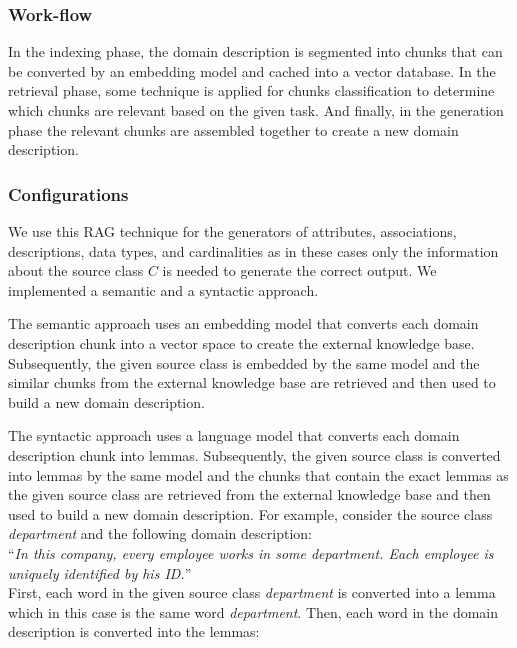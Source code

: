 \subsubsection{Work-flow}

In the indexing phase, the domain description is segmented into chunks that can be converted by an embedding model and cached into a vector database. In the retrieval phase, some technique is applied for chunks classification to determine which chunks are relevant based on the given task. And finally, in the generation phase the relevant chunks are assembled together to create a new domain description.


\subsubsection{Configurations}

We use this RAG technique for the generators of attributes, associations, descriptions, data types, and cardinalities as in these cases only the information about the source class $C$ is needed to generate the correct output. We implemented a semantic and a syntactic approach.

The semantic approach uses an embedding model that converts each domain description chunk into a vector space to create the external knowledge base. Subsequently, the given source class is embedded by the same model and the similar chunks from the external knowledge base are retrieved and then used to build a new domain description.

The syntactic approach uses a language model that converts each domain description chunk into lemmas. Subsequently, the given source class is converted into lemmas by the same model and the chunks that contain the exact lemmas as the given source class are retrieved from the external knowledge base and then used to build a new domain description. For example, consider the source class \textit{department} and the following domain description: \\

\noindent{}``\textit{In this company, every employee works in some department. Each employee is uniquely identified by his ID.}'' \\

\noindent{}First, each word in the given source class \textit{department} is converted into a lemma which in this case is the same word \textit{department}. Then, each word in the domain description is converted into the lemmas: \\

